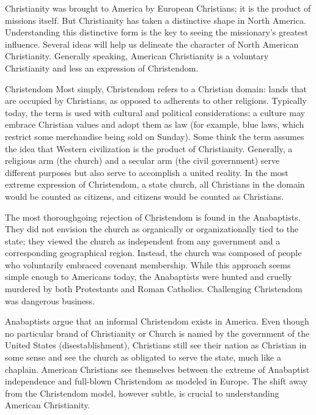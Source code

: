 Christianity was brought to America by European Christians; it is the product of missions itself.
But Christianity has taken a distinctive shape in North America. Understanding this distinctive form
is the key to seeing the missionary’s greatest influence. Several ideas will help us delineate the
character of North American Christianity. Generally speaking, American Christianity is a voluntary
Christianity and less an expression of Christendom.

\begin{sidebar}{Christendom}
Most simply, Christendom refers to a Christian domain: lands that are occupied by Christians, as
opposed to adherents to other religions. Typically today, the term is used with cultural and
political considerations: a culture may embrace Christian values and adopt them as law (for example,
blue laws, which restrict some merchandise being sold on Sunday). Some think the term assumes the
idea that Western civilization is the product of Christianity. Generally, a religious arm (the
church) and a secular arm (the civil government) serve different purposes but also serve to
accomplish a united reality. In the most extreme expression of Christendom, a state church, all
Christians in the domain would be counted as citizens, and citizens would be counted as Christians.
\end{sidebar}

The most thoroughgoing rejection of Christendom is found in the Anabaptists. They did not envision
the church as organically or organizationally tied to the state; they viewed the church as
independent from any government and a corresponding geographical region. Instead, the church was
composed of people who voluntarily embraced covenant membership. While this approach seems simple
enough to Americans today, the Anabaptists were hunted and cruelly murdered by both Protestants and
Roman Catholics. Challenging Christendom was dangerous business.

Anabaptists argue that an informal Christendom exists in America. Even though no particular brand of
Christianity or Church is named by the government of the United States (disestablishment),
Christians still see their nation as Christian in some sense and see the church as obligated to
serve the state, much like a chaplain. American Christians see themselves between the extreme of
Anabaptist independence and full-blown Christendom as modeled in Europe. The shift away from the
Christendom model, however subtle, is crucial to understanding American Christianity.

